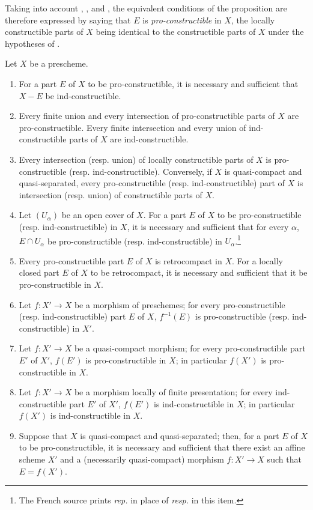 Taking into account , , and , the equivalent conditions of the proposition  are therefore expressed by saying that $E$ is \emph{pro-constructible} in $X$, the locally constructible parts of $X$ being identical to the constructible parts of $X$ under the hypotheses of .


\begin{proposition}[1.9.5]
\label{IV.1.9.5}
Let $X$ be a prescheme.
\begin{enumerate}
  \item[\rm(i)] For a part $E$ of $X$ to be pro-constructible, it is necessary and sufficient that $X-E$ be ind-constructible.
  \item[\rm(ii)] Every finite union and every intersection of pro-constructible parts of $X$ are pro-constructible.
  Every finite intersection and every union of ind-constructible parts of $X$ are ind-constructible.
  \item[\rm(iii)] Every intersection (resp. union) of locally constructible parts of $X$ is pro-constructible (resp. ind-constructible).
  Conversely, if $X$ is quasi-compact and quasi-separated, every pro-constructible (resp. ind-constructible) part of $X$ is intersection (resp. union) of constructible parts of $X$.
  \item[\rm(iv)] Let $(U_\alpha)$ be an open cover of $X$.
  For a part $E$ of $X$ to be pro-constructible (resp. ind-constructible) in $X$, it is necessary and sufficient that for every $\alpha$, $E\cap U_\alpha$ be pro-constructible (resp. ind-constructible) in $U_\alpha$.\footnote{The French source prints \emph{rep.} in place of \emph{resp.} in this item.}
  \item[\rm(v)] Every pro-constructible part $E$ of $X$ is retrocompact in $X$.
  For a locally closed part $E$ of $X$ to be retrocompact, it is necessary and sufficient that it be pro-constructible in $X$.
  \item[\rm(vi)] Let $f:X'\to X$ be a morphism of preschemes; for every pro-constructible (resp. ind-constructible) part $E$ of $X$, $f^{-1}(E)$ is pro-constructible (resp. ind-constructible) in $X'$.
  \item[\rm(vii)] Let $f:X'\to X$ be a quasi-compact morphism; for every pro-constructible part $E'$ of $X'$, $f(E')$ is pro-constructible in $X$; in particular $f(X')$ is pro-constructible in $X$.
  \item[\rm(viii)] Let $f:X'\to X$ be a morphism locally of finite presentation; for every ind-constructible part $E'$ of $X'$, $f(E')$ is ind-constructible in $X$; in particular $f(X')$ is ind-constructible in $X$.
  \item[\rm(ix)] Suppose that $X$ is quasi-compact and quasi-separated; then, for a part $E$ of $X$ to be pro-constructible, it is necessary and sufficient that there exist an affine scheme $X'$ and a (necessarily quasi-compact) morphism $f:X'\to X$ such that $E=f(X')$.
\end{enumerate}
\end{proposition}

